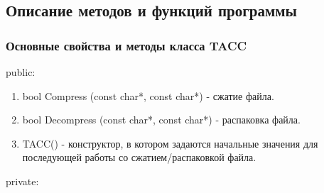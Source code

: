 \documentclass[12pt]{article}
\begin{document}
\subsection*{Описание методов и функций программы}
 
\subsubsection*{Основные свойства и методы класса TACC}
\noindent
public:

\begin{enumerate}
	\item bool Compress (const char*, const char*) - сжатие файла.
	\item bool Decompress (const char*, const char*) - распаковка файла.
	\item TACC() - конструктор, в котором задаются начальные значения для последующей работы со сжатием/распаковкой файла.
\end{enumerate}
\noindent
private:
\end{document}
